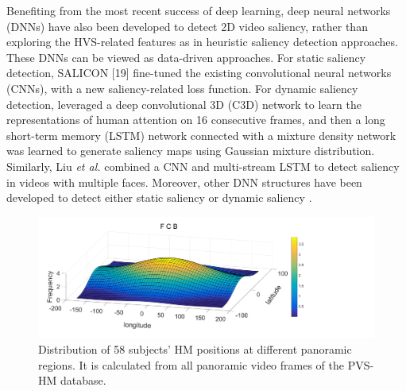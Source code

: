 \documentclass[10pt,journal,compsoc]{IEEEtran}
\begin{document}
Benefiting from the most recent success of deep learning, deep neural networks (DNNs) \cite{huang2015salicon, kruthiventi2015deepfix, wang2016RCNN, bazzani2016recurrent, Liu2017cvpr, bak2016two,wang2017deep} have also been  developed to detect 2D video saliency, rather than exploring the HVS-related features as in heuristic saliency detection approaches. These DNNs can be viewed as data-driven approaches. For static saliency detection, SALICON [19] fine-tuned the existing convolutional neural networks (CNNs), with a new saliency-related loss function. For dynamic saliency detection, \cite{bazzani2016recurrent} leveraged a deep convolutional 3D (C3D) network to learn the representations of human attention on 16 consecutive frames, and then a long short-term memory (LSTM) network connected with a mixture density network was learned to generate saliency maps using Gaussian mixture distribution. Similarly, Liu \textit{et al.} \cite{Liu2017cvpr} combined a CNN and multi-stream LSTM to detect saliency in videos with multiple faces. Moreover, other DNN structures have been developed to detect either static saliency \cite{kruthiventi2015deepfix, wang2016RCNN} or dynamic saliency \cite{bak2016two,bazzani2016recurrent,wang2017deep}.


\begin{figure}
\vspace{-1em}
	\begin{center}
		\centerline{\includegraphics[width=.9\columnwidth]{figures/database/huoshantu}}%
        \vspace{-.5em}
		\caption{\footnotesize{Distribution of 58 subjects' HM positions at different panoramic regions. It is calculated from all panoramic video frames of the PVS-HM database. }}
		\label{huoshantu}
	\end{center}
\vspace{-2.5em}
\end{figure}
\end{document}
